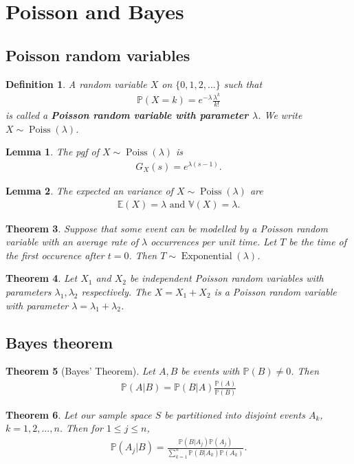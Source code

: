 \documentclass{article}
\theoremstyle{sltheorem}
\newtheorem{definition}{Definition}[section]
\newtheorem{theorem}{Theorem}[section]
\newtheorem{lemma}[theorem]{Lemma}
\renewcommand{\P}{\mathbb{P}}
\newcommand{\E}{\mathbb{E}}
\newcommand{\V}{\mathbb{V}}
\DeclareMathOperator{\Exp}{Exponential}
\DeclareMathOperator{\Poiss}{Poiss}
\newcommand*\B[1]{\textbf{#1}}
\begin{document}
\section{Poisson and Bayes}
\subsection{Poisson random variables}
\begin{definition}
    A random variable $X$ on $\{0,1,2,...\}$ such that
    \begin{align*}
        \P(X=k) = e^{-\lambda}\frac{\lambda^k}{k!}
    \end{align*}
    is called a \B{Poisson random variable with parameter $\lambda$}.
    We write $X\sim\Poiss(\lambda)$.
\end{definition}
\begin{lemma}
    The pgf of $X\sim\Poiss(\lambda)$ is
    \begin{align*}
        G_X(s) = e^{\lambda(s-1)}.
    \end{align*}
\end{lemma}
\begin{lemma}
    The expected an variance of $X\sim\Poiss(\lambda)$ are
    \begin{align*}
        \E(X) = \lambda \text{ and } \V(X) = \lambda.
    \end{align*}
\end{lemma}
\begin{theorem}
    Suppose that some event can be modelled by a Poisson random variable
    with an average rate of $\lambda$ occurrences per unit time. Let $T$
    be the time of the first occurence after $t=0$. Then $T\sim\Exp(\lambda)$.
\end{theorem}
\begin{theorem}
    Let $X_1$ and $X_2$ be independent Poisson random variables with parameters
    $\lambda_1, \lambda_2$ respectively. The $X=X_1 + X_2$ is a Poisson random
    variable with parameter $\lambda=\lambda_1+\lambda_2$.
\end{theorem}
\subsection{Bayes theorem}
\begin{theorem}[Bayes' Theorem]
    Let $A,B$ be events with $\P(B)\not=0$. Then
    \begin{align*}
        \P(A|B)=\P(B|A)\frac{\P(A)}{\P(B)}
    \end{align*}
\end{theorem}
\begin{theorem}
    Let our sample space $S$ be partitioned into disjoint events $A_k$,
    $k=1,2,...,n$. Then for $1\leq j\leq n$,
    \begin{align*}
        \P(A_j|B)=\frac{\P(B|A_j)\P(A_j)}{\sum_{k=1}^n \P(B|A_k)\P(A_k)}.
    \end{align*}
\end{theorem}
\end{document}
